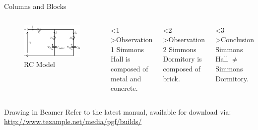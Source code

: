 \documentclass{beamer}
\begin{document}
\begin{frame}{Columns and Blocks}

\begin{columns}

    \begin{figure}[ht]
    \centering\includegraphics[scale=0.6]{rcmodel} 
    \caption{RC Model}
    \end{figure}

\begin{block}<1->{Observation 1}
Simmons Hall is composed of metal and concrete. 
\end{block}
\begin{block}<2->{Observation 2}
Simmons Dormitory is composed of brick.
\end{block}
      
\begin{block}<3->{Conclusion}
Simmons Hall $\not=$ Simmons Dormitory. \end{block}
\end{columns}

\end{frame}

\begin{frame}{Drawing in Beamer}
Refer to the latest manual, available for download via: \\
\url{http://www.texample.net/media/pgf/builds/}\\

\centering{}

\end{frame}
\end{document}
